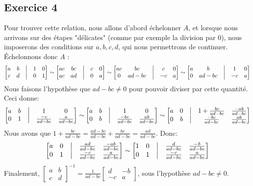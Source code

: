 \documentclass{article}
\begin{document}
\subsection*{Exercice 4}
\noindent Pour trouver cette relation, nous allons d'abord échelonner $A$, et lorsque nous arrivons sur des étapes "délicates" (comme par exemple la division par $0$), nous imposerons des conditions sur $a,b,c,d$, qui nous permettrons de continuer.\\
Échelonnons donc $A$ :
$$\begin{bmatrix} 
a & b & \bigm| & 1 & 0 \\
c & d & \bigm| & 0 & 1
\end{bmatrix} \sim 
\begin{bmatrix} 
ac & bc & \bigm| & c & 0 \\
ac & ad & \bigm| & 0 & a
\end{bmatrix} \sim 
\begin{bmatrix} 
ac & bc & \bigm| & c & 0 \\
0 & ad-bc & \bigm| & -c & a
\end{bmatrix} \sim 
\begin{bmatrix} 
a & b & \bigm| & 1 & 0 \\
0 & ad-bc & \bigm| & -c & a
\end{bmatrix}$$
Nous faisons l'hypothèse que $ad-bc \neq 0$ pour pouvoir diviser par cette quantité. Ceci donne:
$$\begin{bmatrix} 
a & b & \bigm| & 1 & 0 \\
0 & 1 & \bigm| & \frac{-c}{ad-bc} & \frac{a}{ad-bc}
\end{bmatrix} \sim 
\begin{bmatrix} 
a & b & \bigm| & 1 & 0 \\
0 & b & \bigm| & \frac{-bc}{ad-bc} & \frac{ab}{ad-bc}
\end{bmatrix} \sim
\begin{bmatrix} 
a & 0 & \bigm| & 1 + \frac{bc}{ad-bc}& \frac{-ab}{ad-bc} \\
0 & b & \bigm| & \frac{-bc}{ad-bc} & \frac{ab}{ad-bc}
\end{bmatrix}$$
Nous avons que $1 + \frac{bc}{ad-bc} = \frac{ad-bc}{ad-bc} + \frac{bc}{ad-bc} = \frac{ad}{ad-bc}$. Donc:
$$\begin{bmatrix} 
a & 0 & \bigm| & \frac{ad}{ad-bc}& \frac{-ab}{ad-bc} \\
0 & 1 & \bigm| & \frac{-c}{ad-bc} & \frac{a}{ad-bc}
\end{bmatrix} \sim
\begin{bmatrix}
1 & 0 & \bigm| & \frac{d}{ad-bc}& \frac{-b}{ad-bc} \\
0 & 1 & \bigm| & \frac{-c}{ad-bc} & \frac{a}{ad-bc}
\end{bmatrix}$$
Finalement, $\displaystyle \begin{bmatrix} a & b \\ c & d \end{bmatrix}^{-1} = \frac{1}{ad-bc} \begin{bmatrix} d & -b \\ -c & a \end{bmatrix}$, sous l'hypothèse $ad-bc \neq 0$. \\
\end{document}
